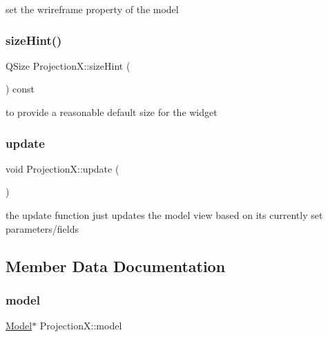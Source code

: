 set the wrireframe property of the model 

\mbox{\label{class_projection_x_ad1a6cdc49e0cb1000bc67401a6a8b3a9}} 
\subsubsection{\texorpdfstring{size\+Hint()}{sizeHint()}}
{\footnotesize\ttfamily Q\+Size Projection\+X\+::size\+Hint (\begin{DoxyParamCaption}{ }\end{DoxyParamCaption}) const\hspace{0.3cm}{\ttfamily [protected]}}



to provide a reasonable default size for the widget 

\mbox{\label{class_projection_x_a7efa3839fdf999686464fe60ea59a349}} 
\subsubsection{\texorpdfstring{update}{update}}
{\footnotesize\ttfamily void Projection\+X\+::update (\begin{DoxyParamCaption}{ }\end{DoxyParamCaption})\hspace{0.3cm}{\ttfamily [slot]}}



the update function just updates the model view based on its currently set parameters/fields 



\subsection{Member Data Documentation}
\mbox{\label{class_projection_x_af85d1d33a1a51fa6aef5359f53b98580}} 
\subsubsection{\texorpdfstring{model}{model}}
{\footnotesize\ttfamily \mbox{\hyperlink{class_model}{Model}}$\ast$ Projection\+X\+::model}



